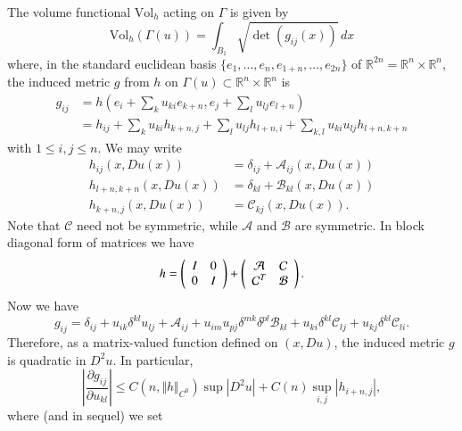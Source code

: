 \documentclass[12pt,leqno]{amsart}%
\theoremstyle{plain}
\numberwithin{equation}{section}
\theoremstyle{definition}
\begin{document}
The volume functional $\mbox{Vol}_{h}$ acting on $\Gamma$ is given by
\[
\mbox{Vol}_{h}(\Gamma(u))=\int_{B_{1}}\sqrt{\det(g_{ij}(x))}\,dx
\]
where, in the standard euclidean basis $\{e_{1},\dots,e_{n},e_{1+n}%
,\dots,e_{2n}\}$ of $\mathbb{R}^{2n}=\mathbb{R}^{n}\times\mathbb{R}^{n}$, the
induced metric $g$ from $h$ on $\Gamma(u)\subset\mathbb{R}^{n}\times
\mathbb{R}^{n}$ is
\begin{align}
g_{ij} &  =h(e_{i}+\sum_{k}u_{ki}e_{k+n},e_{j}+\sum_{l}u_{lj}e_{l+n}%
)\label{induced metric}\\
&  =h_{ij}+\sum_{k}u_{ki}h_{k+n,j}+\sum_{l}u_{lj}h_{l+n,i}+\sum_{k,l}%
u_{ki}u_{lj}h_{l+n,k+n}\nonumber
\end{align}
with $1\leq i,j\leq n$. We may write
\begin{align*}
h_{ij}(x,Du(x)) &  =\delta_{ij}+{\mathcal{A}}_{ij}(x,Du(x))\\
h_{l+n,k+n}(x,Du(x)) &  =\delta_{kl}+{\mathcal{B}}_{kl}(x,Du(x))\\
h_{k+n,j}(x,Du(x)) &  ={\mathcal{C}}_{kj}(x,Du(x)).
\end{align*}
Note that $\mathcal{C}$ need not be symmetric, while $\mathcal{A}$ and
$\mathcal{B}$ are symmetric. In block diagonal form of matrices we have
\begin{equation}
h=\left(
\begin{array}
[c]{cc}%
I & 0\\
0 & I
\end{array}
\right)  +\left(
\begin{array}
[c]{cc}%
\mathcal{A} & \mathcal{C}\\
\mathcal{C}^{T} & \mathcal{B}%
\end{array}
\right)  .\label{defhm}%
\end{equation}
Now we have
\begin{equation}
g_{ij}=\delta_{ij}+u_{ik}\delta^{kl}u_{lj}+{\mathcal{A}}_{ij}+u_{im}%
u_{pj}\delta^{mk}\delta^{pl}{\mathcal{B}}_{kl}+u_{ki}\delta^{kl}{\mathcal{C}%
}_{lj}+u_{kj}\delta^{kl}{\mathcal{C}}_{li}.\label{gdur}%
\end{equation}
Therefore, as a matrix-valued function defined on $(x,Du)$, the induced metric
$g$ is quadratic in $D^{2}u$. In particular,
\begin{equation}
\left\vert \frac{\partial g_{ij}}{\partial u_{kl}}\right\vert \leq C(n,\Vert
h\Vert_{C^{0}})\sup\left\vert D^{2}u\right\vert +C(n)\sup_{i,j}\left\vert
h_{i+n,j}\right\vert ,\label{g derivative}%
\end{equation}
where (and in sequel) we set
\end{document}
